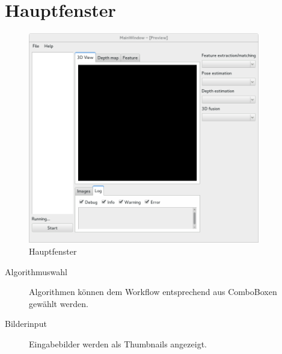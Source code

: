 
\section{Hauptfenster}

\begin{figure}[h]
	\centering
	\includegraphics[width=0.9\textwidth]{img/Screenshot.png}
	\caption{Hauptfenster}
	\label{c:Hauptfenster}
\end{figure}

\begin{description}
	\item[Algorithmuswahl] Algorithmen können dem Workflow entsprechend aus ComboBoxen gewählt werden.
	\item[Bilderinput] Eingabebilder werden als Thumbnails angezeigt.
\end{description}